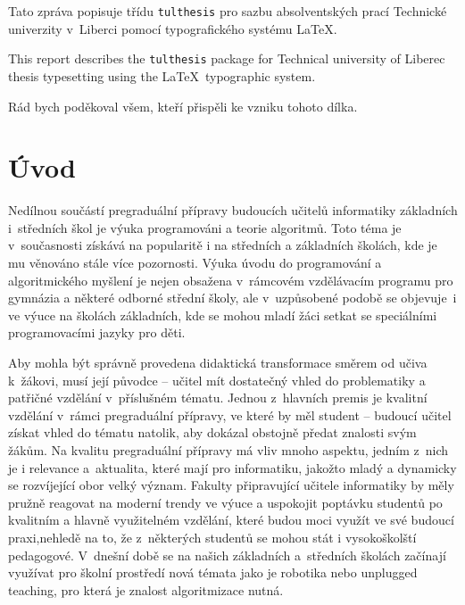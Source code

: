 \documentclass[FP,DP]{tulthesis}
\begin{document}

\begin{abstractCZ}
Tato zpráva popisuje třídu \texttt{tulthesis} pro sazbu absolventských prací
Technické univerzity v~Liberci pomocí typografického systému \LaTeX.
\end{abstractCZ}

\vspace{2cm}

\begin{abstractEN}
This report describes the \texttt{tulthesis} package for Technical university of
Liberec thesis typesetting using the \LaTeX\ typographic system.
\end{abstractEN}

\clearpage

\begin{acknowledgement}
Rád bych poděkoval všem, kteří přispěli ke vzniku tohoto dílka.
\end{acknowledgement}

\tableofcontents

\clearpage

\chapter{Úvod}
Nedílnou součástí pregraduální přípravy budoucích učitelů informatiky základních i~středních škol je výuka programováni a teorie algoritmů. Toto téma je v~současnosti získává na popularitě i na středních a základních školách, kde je mu věnováno stále více pozornosti. Výuka úvodu do programování a algoritmického myšlení je nejen obsažena v~rámcovém vzdělávacím programu pro gymnázia a některé odborné střední školy, ale v~uzpůsobené podobě se objevuje~i ve výuce na školách základních, kde se mohou mladí žáci setkat se speciálními programovacími jazyky pro děti.

Aby mohla být správně provedena didaktická transformace směrem od učiva k~žákovi, musí její původce -- učitel mít dostatečný vhled do problematiky a~ patřičné vzdělání v~příslušném tématu. Jednou z~hlavních premis je kvalitní vzdělání v~rámci pregraduální přípravy, ve které by měl student -- budoucí učitel získat vhled do tématu natolik, aby dokázal obstojně předat znalosti svým žákům. Na kvalitu pregraduální přípravy má vliv mnoho aspektu, jedním z~nich je i relevance a~aktualita, které mají pro informatiku, jakožto mladý a dynamicky se rozvíjející obor velký význam. Fakulty připravující učitele informatiky by měly pružně reagovat na moderní trendy ve výuce a uspokojit poptávku studentů po kvalitním a hlavně využitelném vzdělání, které budou moci využít ve své budoucí praxi,nehledě na to, že z~některých studentů se mohou stát i vysokoškolští pedagogové.  V~dnešní době se na našich základních a~středních školách začínají využívat pro školní prostředí nová témata jako je robotika nebo unplugged teaching, pro která je znalost algoritmizace nutná. 
\end{document}

